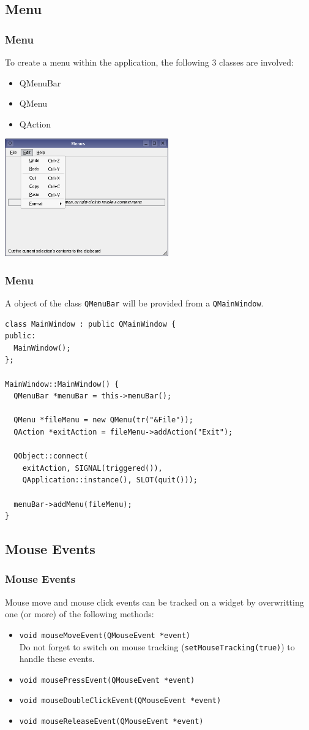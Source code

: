 \subsection{Menu}
\begin{frame}[fragile]
\frametitle{Menu}
To create a menu within the application, the following 3 classes are
involved:
\begin{itemize}
\item QMenuBar
\item QMenu
\item QAction
\end{itemize}
\includegraphics[width=200pt]{img/menus-example.png}
\end{frame}

\begin{frame}[fragile]
\frametitle{Menu}
A object of the class \verb|QMenuBar| will be provided from a \verb|QMainWindow|.
{\tiny
\begin{lstlisting}
class MainWindow : public QMainWindow {
public:
  MainWindow();
};

MainWindow::MainWindow() {
  QMenuBar *menuBar = this->menuBar();
  
  QMenu *fileMenu = new QMenu(tr("&File"));
  QAction *exitAction = fileMenu->addAction("Exit");

  QObject::connect(
    exitAction, SIGNAL(triggered()),
    QApplication::instance(), SLOT(quit()));

  menuBar->addMenu(fileMenu);
}
\end{lstlisting}
}
\end{frame}

\subsection{Mouse Events}
\begin{frame}[fragile]
\frametitle{Mouse Events}
Mouse move and mouse click events can be tracked on a widget by
overwritting one (or more) of the following methods:

\begin{itemize}
\item \verb|void mouseMoveEvent(QMouseEvent *event)|\\
Do not forget to switch on mouse tracking (\verb|setMouseTracking(true)|) to handle these events.
\item \verb|void mousePressEvent(QMouseEvent *event)|
\item \verb|void mouseDoubleClickEvent(QMouseEvent *event)|
\item \verb|void mouseReleaseEvent(QMouseEvent *event)|
\end{itemize}

\end{frame}

